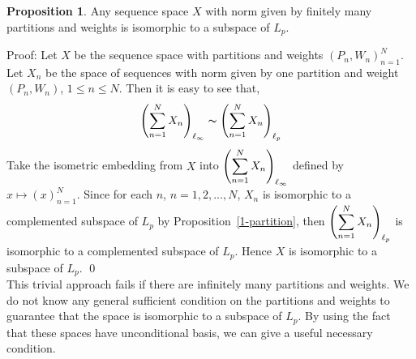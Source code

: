 \documentclass[12pt]{amsart}
\theoremstyle{definition}
\newtheorem{proposition}[theorem]{Proposition}
\theoremstyle{remark}
\numberwithin{equation}{section}
\begin{document}
\begin{proposition}
Any sequence space $X$ with norm given by finitely many partitions and
weights is isomorphic to a subspace of $L_p$.
\end{proposition}

Proof: Let $X$ be the sequence space with partitions and weights
$(P_n, W_n)_{n=1}^{N}$. Let $X_n$ be the space of sequences with norm
given by one partition
and weight $(P_n, W_n)$, $1\leq n \leq N$. Then it is easy to see that, 
$$\begin{displaystyle}\left(\sum_{n=1}^{N} X_n\right)_{\ell_{\infty}}\thicksim
\left(\sum_{n=1}^{N} X_n\right)_{\ell_p}\end{displaystyle}$$
Take the isometric embedding from $X$ into 
$\begin{displaystyle}\left(\sum_{n=1}^{N}
X_n\right)_{\ell_{\infty}}\end{displaystyle}$ 
defined by $x\mapsto (x)_{n=1}^{N}$. Since 
 for each $n$, $n=1,2,...,N$, $X_n$ is
isomorphic to a complemented subspace of $L_p$
by Proposition~\ref{1-partition},
then  $\begin{displaystyle}\left(\sum_{n=1}^{N}
X_n\right)_{\ell_p}\end{displaystyle}$ is isomorphic to a complemented
subspace of $L_p$. Hence $X$ is isomorphic to a subspace of $L_p$.
\qed \\

This trivial approach fails if there are infinitely many partitions
and weights. We do not know any general sufficient condition on the
partitions and weights to guarantee that the space is isomorphic to a 
subspace of $L_p$. By using the fact that these spaces have
unconditional basis, we can give a useful necessary condition.\\
\end{document}
